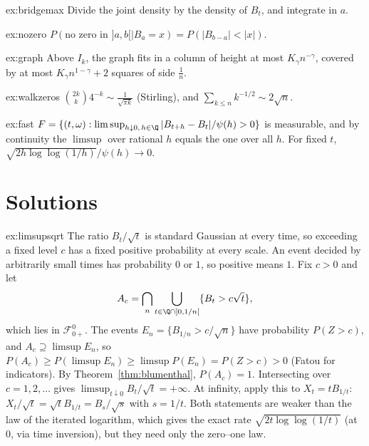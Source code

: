 \begin{hint}{ex:bridgemax}
Divide the joint density by the density of $B_t$, and integrate in $a$.
\end{hint}

\begin{hint}{ex:nozero}
$P(\text{no zero in }]a,b[\mid B_a=x)=P(|B_{b-a}|<|x|)$.
\end{hint}

\begin{hint}{ex:graph}
Above $I_k$, the graph fits in a column of height at most $K_\gamma n^{-\gamma}$, covered by at most $K_\gamma n^{1-\gamma}+2$ squares of side $\frac1n$.
\end{hint}

\begin{hint}{ex:walkzeros}
$\binom{2k}k4^{-k}\sim\frac1{\sqrt{\pi k}}$ (Stirling), and $\sum_{k\le n}k^{-1/2}\sim2\sqrt n$.
\end{hint}

\begin{hint}{ex:fast}
$F=\{(t,\omega):\limsup_{h\downarrow0,\,h\in\Q}|B_{t+h}-B_t|/\psi(h)>0\}$ is measurable, and by continuity the $\limsup$ over rational $h$ equals the one over all $h$. For fixed $t$, $\sqrt{2h\log\log(1/h)}/\psi(h)\to0$.
\end{hint}

\section{Solutions}

\begin{solution}{ex:limsupsqrt}
\idea The ratio $B_t/\sqrt t$ is standard Gaussian at every time, so exceeding a fixed level $c$ has a fixed positive probability at every scale. An event decided by arbitrarily small times has
probability $0$ or $1$, so positive means $1$.
\writeup Fix $c>0$ and let
\[A_c=\bigcap_n\bigcup_{t\in\Q\cap]0,1/n[}\{B_t>c\sqrt t\},\]
which lies in $\mathcal F^0_{0+}$. The events $E_n=\{B_{1/n}>c/\sqrt n\}$ have probability $P(Z>c)$, and
$A_c\supseteq\limsup E_n$, so $P(A_c)\ge P(\limsup E_n)\ge\limsup P(E_n)=P(Z>c)>0$ (Fatou for indicators). By Theorem~\ref{thm:blumenthal}, $P(A_c)=1$. Intersecting over $c=1,2,\dots$ gives
$\limsup_{t\downarrow0}B_t/\sqrt t=+\infty$. At infinity, apply this to $X_t=tB_{1/t}$: $X_t/\sqrt t=\sqrt tB_{1/t}=B_s/\sqrt s$ with $s=1/t$. Both statements are weaker than the law of the iterated logarithm, which gives the
exact rate $\sqrt{2t\log\log(1/t)}$ (at $0$, via time inversion), but they need only the zero--one law.
\end{solution}

